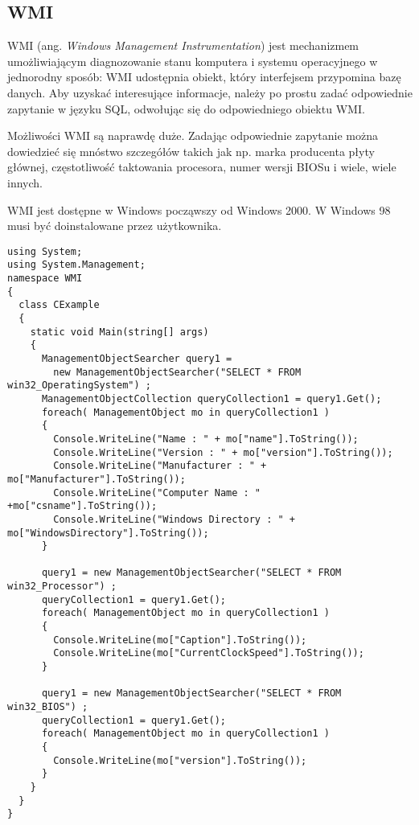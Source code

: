 \subsection{WMI}

WMI (ang. {\em Windows Management Instrumentation}) jest mechanizmem umożliwiającym diagnozowanie
stanu komputera i systemu operacyjnego w jednorodny sposób: WMI udostępnia obiekt, który
interfejsem przypomina bazę danych. Aby uzyskać interesujące informacje, należy po prostu zadać
odpowiednie zapytanie w języku SQL, odwołując się do odpowiedniego obiektu WMI. 

Możliwości WMI są naprawdę duże. Zadając odpowiednie zapytanie można dowiedzieć się mnóstwo
szczegółów takich jak np. marka producenta płyty głównej, częstotliwość taktowania procesora, numer
wersji BIOSu i wiele, wiele innych.

WMI jest dostępne w Windows począwszy od Windows 2000. W Windows 98 musi być doinstalowane przez
użytkownika.

\begin{scriptsize}
\begin{verbatim}
using System;
using System.Management;
namespace WMI
{
  class CExample
  {
    static void Main(string[] args)
    {
      ManagementObjectSearcher query1 = 
        new ManagementObjectSearcher("SELECT * FROM win32_OperatingSystem") ;
      ManagementObjectCollection queryCollection1 = query1.Get();
      foreach( ManagementObject mo in queryCollection1 ) 
      {
        Console.WriteLine("Name : " + mo["name"].ToString());
        Console.WriteLine("Version : " + mo["version"].ToString());
        Console.WriteLine("Manufacturer : " + mo["Manufacturer"].ToString());
        Console.WriteLine("Computer Name : " +mo["csname"].ToString());
        Console.WriteLine("Windows Directory : " + mo["WindowsDirectory"].ToString());
      }                  

      query1 = new ManagementObjectSearcher("SELECT * FROM win32_Processor") ;
      queryCollection1 = query1.Get();
      foreach( ManagementObject mo in queryCollection1 ) 
      {
        Console.WriteLine(mo["Caption"].ToString());
        Console.WriteLine(mo["CurrentClockSpeed"].ToString());
      }                       

      query1 = new ManagementObjectSearcher("SELECT * FROM win32_BIOS") ;
      queryCollection1 = query1.Get();
      foreach( ManagementObject mo in queryCollection1 ) 
      {
        Console.WriteLine(mo["version"].ToString());
      }                                   
    }
  }
}
\end{verbatim}
\end{scriptsize}

